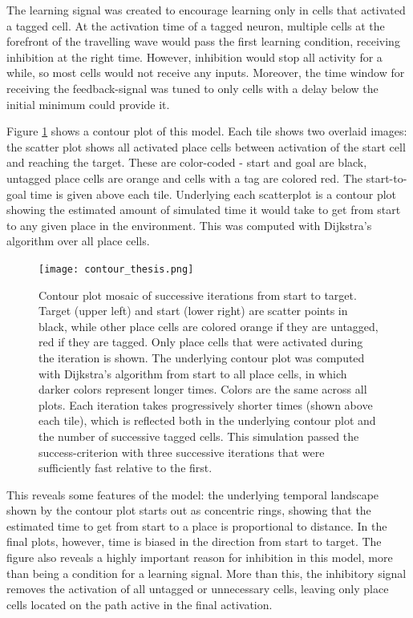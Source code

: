 \documentclass{article}
\begin{document}
    The learning signal was created to encourage learning only in cells that activated a tagged cell. At the activation time of a tagged neuron, multiple cells at the forefront of the travelling wave would pass the first learning condition, receiving inhibition at the right time. However, inhibition would stop all activity for a while, so most cells would not receive any inputs. Moreover, the time window for receiving the feedback-signal was tuned to only cells with a delay below the initial minimum could provide it.

    Figure \ref{contour_plot} shows a contour plot of this model. Each tile shows two overlaid images: the scatter plot shows all activated place cells between activation of the start cell and reaching the target. These are color-coded - start and goal are black, untagged place cells are orange and cells with a tag are colored red. The start-to-goal time is given above each tile.
    Underlying each scatterplot is a contour plot showing the estimated amount of simulated time it would take to get from start to any given place in the environment. This was computed with Dijkstra's algorithm over all place cells. 

    \begin{figure}[H]
        \texttt{[image: contour\_thesis.png]}
        \caption{Contour plot mosaic of successive iterations from start to target. Target (upper left) and start (lower right) are scatter points in black, while other place cells are colored orange if they are untagged, red if they are tagged. Only place cells that were activated during the iteration is shown. The underlying contour plot was computed with Dijkstra's algorithm from start to all place cells, in which darker colors represent longer times. Colors are the same across all plots. Each iteration takes progressively shorter times (shown above each tile), which is reflected both in the underlying contour plot and the number of successive tagged cells. This simulation passed the success-criterion with three successive iterations that were sufficiently fast relative to the first.}
        \label{contour_plot}
    \end{figure}

    This reveals some features of the model: the underlying temporal landscape shown by the contour plot starts out as concentric rings, showing that the estimated time to get from start to a place is proportional to distance. In the final plots, however, time is biased in the direction from start to target.
    The figure also reveals a highly important reason for inhibition in this model, more than being a condition for a learning signal. More than this, the inhibitory signal removes the activation of all untagged or unnecessary cells, leaving only place cells located on the path active in the final activation. 
\end{document}
